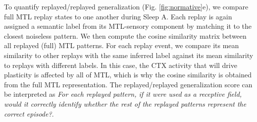 \documentclass{article}
\begin{document}
\newline\newline
To quantify replayed/replayed generalization (Fig. \ref{fig:normative}e), we compare full MTL replay states to one another during Sleep A. Each replay is again assigned a semantic label from its MTL-sensory component by matching it to the closest noiseless pattern. We then compute the cosine similarity matrix between all replayed (full) MTL patterns. For each replay event, we compare its mean similarity to other replays with the same inferred label against its mean similarity to replays with different labels. In this case, the CTX activity that will drive plasticity is affected by all of MTL, which is why the cosine similarity is obtained from the full MTL representation. The replayed/replayed generalization score can be interpreted as \textit{For each replayed pattern, if it were used as a receptive field, would it correctly identify whether the rest of the replayed patterns represent the correct episode?}.
\end{document}
